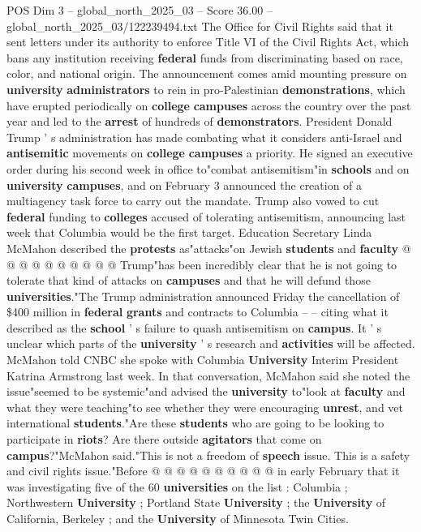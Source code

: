 \begin{textsample}{POS Dim 3 – global\_north\_2025\_03 – Score 36.00 – global\_north\_2025\_03/122239494.txt}  \label{ex:f3_pos_021}
The Office for Civil Rights said that it sent letters under its authority to enforce Title VI of the Civil Rights Act, which bans any institution receiving \textbf{federal} funds from discriminating based on race, color, and national origin.
The announcement comes amid mounting pressure on \textbf{university} \textbf{administrators} to rein in pro-Palestinian \textbf{demonstrations}, which have erupted periodically on \textbf{college} \textbf{campuses} across the country over the past year and led to the \textbf{arrest} of hundreds of \textbf{demonstrators}.
President Donald Trump ' s administration has made combating what it considers anti-Israel and \textbf{antisemitic} movements on \textbf{college} \textbf{campuses} a priority.
He signed an executive order during his second week in office to"combat antisemitism"in \textbf{schools} and on \textbf{university} \textbf{campuses}, and on February 3 announced the creation of a multiagency task force to carry out the mandate.
Trump also vowed to cut \textbf{federal} funding to \textbf{colleges} accused of tolerating antisemitism, announcing last week that Columbia would be the first target.
Education Secretary Linda McMahon described the \textbf{protests} as"attacks"on Jewish \textbf{students} and \textbf{faculty} @ @ @ @ @ @ @ @ @ @ Trump"has been incredibly clear that he is not going to tolerate that kind of attacks on \textbf{campuses} and that he will defund those \textbf{universities}."The Trump administration announced Friday the cancellation of \$400 million in \textbf{federal} \textbf{grants} and contracts to Columbia -- -- citing what it described as the \textbf{school} ' s failure to quash antisemitism on \textbf{campus}.
It ' s unclear which parts of the \textbf{university} ' s research and \textbf{activities} will be affected.
McMahon told CNBC she spoke with Columbia \textbf{University} Interim President Katrina Armstrong last week.
In that conversation, McMahon said she noted the issue"seemed to be systemic"and advised the \textbf{university} to"look at \textbf{faculty} and what they were teaching"to see whether they were encouraging \textbf{unrest}, and vet international \textbf{students}."Are these \textbf{students} who are going to be looking to participate in \textbf{riots}?
Are there outside \textbf{agitators} that come on \textbf{campus}?"McMahon said."This is not a freedom of \textbf{speech} issue.
This is a safety and civil rights issue."Before @ @ @ @ @ @ @ @ @ @ in early February that it was investigating five of the 60 \textbf{universities} on the list : Columbia ; Northwestern \textbf{University} ; Portland State \textbf{University} ; the \textbf{University} of California, Berkeley ; and the \textbf{University} of Minnesota Twin Cities.

\end{textsample}
